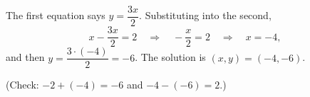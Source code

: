 The first equation says $y=\dfrac{3x}{2}$. Substituting into the second,
\[x-\dfrac{3x}{2}=2\quad\Longrightarrow\quad -\dfrac{x}{2}=2\quad\Longrightarrow\quad x=-4,\]
and then $y=\dfrac{3\cdot(-4)}{2}=-6$. The solution is $\boxed{(x,y)=(-4,-6)}$.

(Check: $-2+(-4)=-6$ and $-4-(-6)=2$.)
